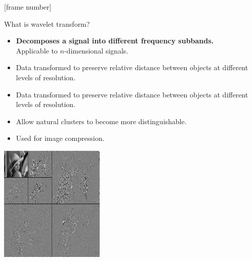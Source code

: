 \documentclass[aspectratio=169,t]{beamer}
\begin{document}
  {
    [frame number]
    \begin{frame}{What is wavelet transform?}
    \begin{minipage}[b]{0.55\textwidth}
      \begin{itemize}
        \item \textbf{Decomposes a signal into different frequency subbands.}\\
              Applicable to $n$-dimensional signals.
        \item Data transformed to preserve relative distance between objects at different levels of resolution.
        \item Data transformed to preserve relative distance between objects at different levels of resolution.
        \item Allow natural clusters to become more distinguishable.
        \item Used for image compression.
      \end{itemize}
    \end{minipage}\hspace{1cm}
    \begin{minipage}[b]{0.30\textwidth}
      \includegraphics[width=5cm]{img/wavelettransform.png}
    \end{minipage}
    \end{frame}
  }
\end{document}
